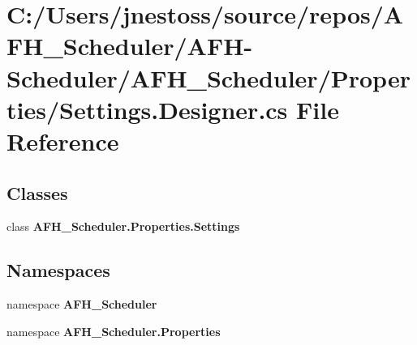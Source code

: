 \section{C\+:/\+Users/jnestoss/source/repos/\+A\+F\+H\+\_\+\+Scheduler/\+A\+F\+H-\/\+Scheduler/\+A\+F\+H\+\_\+\+Scheduler/\+Properties/\+Settings.Designer.\+cs File Reference}
\label{_settings_8_designer_8cs}
\subsection*{Classes}
\begin{DoxyCompactItemize}
\item 
class \textbf{ A\+F\+H\+\_\+\+Scheduler.\+Properties.\+Settings}
\end{DoxyCompactItemize}
\subsection*{Namespaces}
\begin{DoxyCompactItemize}
\item 
namespace \textbf{ A\+F\+H\+\_\+\+Scheduler}
\item 
namespace \textbf{ A\+F\+H\+\_\+\+Scheduler.\+Properties}
\end{DoxyCompactItemize}
